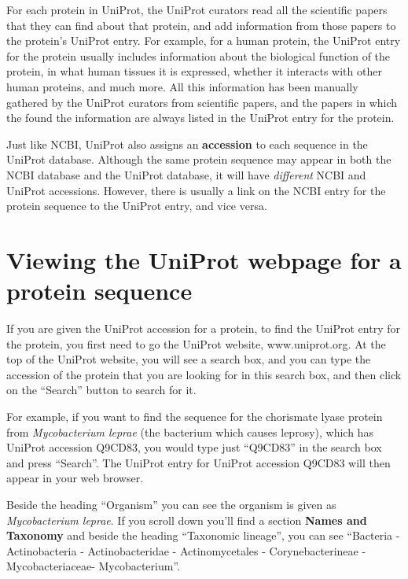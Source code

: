 \documentclass[
]{book}
\begin{document}
For each protein in UniProt, the UniProt curators read all the scientific papers that they can find about that protein, and add information from those papers to the protein's UniProt entry. For example, for a human protein, the UniProt entry for the protein usually includes information about the biological function of the protein, in what human tissues it is expressed, whether it interacts with other human proteins, and much more. All this information has been manually gathered by the UniProt curators from scientific papers, and the papers in which the found the information are always listed in the UniProt entry for the protein.

Just like NCBI, UniProt also assigns an \textbf{accession} to each sequence in the UniProt database. Although the same protein sequence may appear in both the NCBI database and the UniProt database, it will have \emph{different} NCBI and UniProt accessions. However, there is usually a link on the NCBI entry for the protein sequence to the UniProt entry, and vice versa.

\hypertarget{viewing-the-uniprot-webpage-for-a-protein-sequence}{%
\section{Viewing the UniProt webpage for a protein sequence}\label{viewing-the-uniprot-webpage-for-a-protein-sequence}}

If you are given the UniProt accession for a protein, to find the UniProt entry for the protein, you first need to go the UniProt website, www.uniprot.org. At the top of the UniProt website, you will see a search box, and you can type the accession of the protein that you are looking for in this search box, and then click on the ``Search'' button to search for it.

For example, if you want to find the sequence for the chorismate lyase protein from \emph{Mycobacterium leprae} (the bacterium which causes leprosy), which has UniProt accession Q9CD83, you would type just ``Q9CD83'' in the search box and press ``Search''. The UniProt entry for UniProt accession Q9CD83 will then appear in your web browser.

Beside the heading ``Organism'' you can see the organism is given as \emph{Mycobacterium leprae}. If you scroll down you'll find a section \textbf{Names and Taxonomy} and beside the heading ``Taxonomic lineage'', you can see ``Bacteria - Actinobacteria - Actinobacteridae - Actinomycetales - Corynebacterineae - Mycobacteriaceae- Mycobacterium''.
\end{document}
